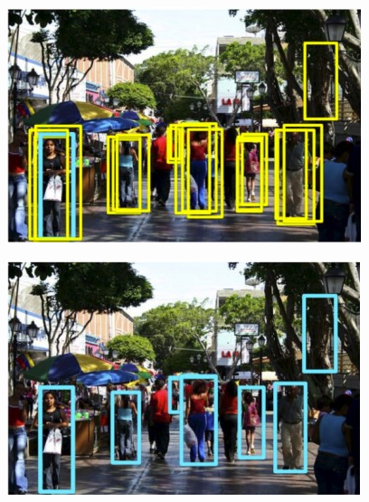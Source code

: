 \begin{figure}[h!]
		\centering
		\includegraphics[scale = 2.0]{img/multiple boxes.jpg}
\end{figure}


\begin{figure}[h!]
		\centering
		\includegraphics[scale = 2.0]{img/results.jpg}
\end{figure}
